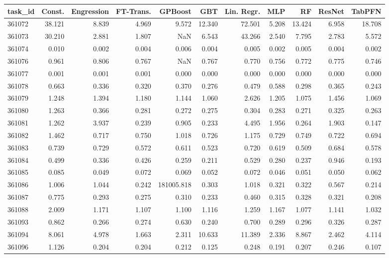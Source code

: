\begin{tabular}{lrrrrrrrrrr}
\toprule
task\_id & Const. & Engression & FT-Trans. & GPBoost & GBT & Lin. Regr. & MLP & RF & ResNet & TabPFN \\
\midrule
361072 & 38.121 & 8.839 & 4.969 & 9.572 & 12.340 & 72.501 & 5.208 & 13.424 & 6.958 & 18.708 \\
361073 & 30.210 & 2.881 & 1.807 & NaN & 6.543 & 43.266 & 2.540 & 7.795 & 2.783 & 5.572 \\
361074 & 0.010 & 0.002 & 0.004 & 0.006 & 0.004 & 0.005 & 0.002 & 0.005 & 0.004 & 0.002 \\
361076 & 0.961 & 0.806 & 0.767 & NaN & 0.767 & 0.770 & 0.756 & 0.772 & 0.775 & 0.746 \\
361077 & 0.001 & 0.001 & 0.001 & 0.000 & 0.000 & 0.000 & 0.000 & 0.000 & 0.000 & 0.000 \\
361078 & 0.663 & 0.336 & 0.320 & 0.370 & 0.276 & 0.479 & 0.588 & 0.298 & 0.365 & 0.243 \\
361079 & 1.248 & 1.394 & 1.180 & 1.144 & 1.060 & 2.626 & 1.205 & 1.075 & 1.456 & 1.069 \\
361080 & 1.263 & 0.366 & 0.281 & 0.272 & 0.275 & 0.304 & 0.283 & 0.271 & 0.325 & 0.263 \\
361081 & 1.262 & 3.937 & 0.239 & 0.905 & 0.233 & 4.495 & 1.956 & 0.264 & 1.903 & 0.147 \\
361082 & 1.462 & 0.717 & 0.750 & 1.018 & 0.726 & 1.175 & 0.729 & 0.749 & 0.722 & 0.694 \\
361083 & 0.739 & 0.729 & 0.572 & 0.611 & 0.523 & 0.720 & 0.619 & 0.509 & 0.684 & 0.578 \\
361084 & 0.499 & 0.336 & 0.426 & 0.259 & 0.211 & 0.529 & 0.280 & 0.237 & 0.946 & 0.193 \\
361085 & 0.085 & 0.049 & 0.072 & 0.069 & 0.052 & 0.072 & 0.046 & 0.051 & 0.050 & 0.062 \\
361086 & 1.006 & 1.044 & 0.242 & 181005.818 & 0.303 & 1.018 & 0.321 & 0.322 & 0.567 & 0.214 \\
361087 & 0.775 & 0.293 & 0.275 & 0.310 & 0.233 & 0.460 & 0.315 & 0.328 & 0.321 & 0.208 \\
361088 & 2.009 & 1.171 & 1.107 & 1.100 & 1.116 & 1.259 & 1.167 & 1.077 & 1.141 & 1.032 \\
361093 & 0.862 & 0.266 & 0.274 & 0.630 & 0.240 & 0.700 & 0.289 & 0.296 & 0.326 & 0.287 \\
361094 & 8.061 & 4.978 & 1.663 & 2.311 & 10.633 & 11.389 & 2.336 & 8.867 & 2.462 & 4.114 \\
361096 & 1.126 & 0.204 & 0.204 & 0.212 & 0.125 & 0.248 & 0.191 & 0.207 & 0.246 & 0.107 \\

\end{tabular}
